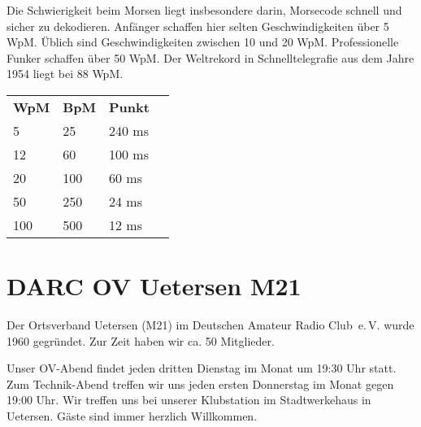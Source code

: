 \documentclass{scrartcl}
\begin{document}
    Die Schwierigkeit beim Morsen liegt insbesondere darin,
    Morsecode schnell und sicher zu dekodieren.
    Anfänger schaffen hier selten Geschwindigkeiten über 5 WpM.
    Üblich sind Geschwindigkeiten zwischen 10 und 20 WpM. Professionelle
    Funker schaffen über 50 WpM. Der Weltrekord in Schnelltelegrafie
    aus dem Jahre 1954 liegt bei 88 WpM.
    
    \begin{tabular}{@{}llll}
      \bfseries WpM & \bfseries BpM & \bfseries Punkt \\
      5 & 25 & 240 ms \\
      12 & 60 & 100 ms \\
      20 & 100 & 60 ms \\
      50 & 250 & 24 ms \\
      100 & 500 & 12 ms
    \end{tabular}
    
    \section{DARC OV Uetersen M21}
    
    Der Ortsverband Uetersen (M21) im Deutschen Amateur Radio Club~e.\,V.
    wurde 1960 gegründet. Zur Zeit haben wir ca. 50 Mitglieder.

    Unser OV-Abend findet jeden dritten Dienstag im Monat um 19:30 Uhr
    statt. Zum Technik-Abend treffen wir uns jeden ersten Donnerstag im Monat
    gegen 19:00 Uhr. Wir treffen uns bei unserer Klubstation im Stadtwerkehaus
    in Uetersen. Gäste sind immer herzlich Willkommen.
    
\end{document}
